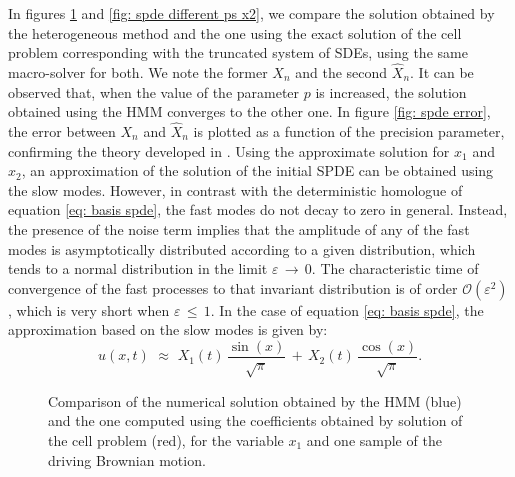 In figures \ref{fig: spde different ps x1} and \ref{fig: spde different ps x2}, we compare the solution obtained by the heterogeneous method and the one using the exact solution of the cell problem corresponding with the truncated system of SDEs, using the same macro-solver for both. We note the former $X_n$ and the second $\hat X_n$. It can be observed that, when the value of the parameter $p$ is increased, the solution obtained using the HMM converges to the other one. In figure \ref{fig: spde error}, the error between $X_n$ and $\hat X_n$ is plotted as a function of the precision parameter, confirming the theory developed in \citep{abdulle2012numerical,weinan2005analysis}. Using the approximate solution for $x_1$ and $x_2$, an approximation of the solution of the initial SPDE can be obtained using the slow modes. However, in contrast with the deterministic homologue of equation \eqref{eq: basis spde}, the fast modes do not  decay to zero in general. Instead, the presence of the noise term implies that the amplitude of any of the fast modes is asymptotically distributed according to a given distribution, which tends to a normal distribution in the limit ${\varepsilon}\,\to\, 0$. The characteristic time of convergence of the fast processes to that invariant distribution is of order $\mathcal O({\varepsilon}^2)$, which is very short when ${\varepsilon}\,\leq\,1$. In the case of equation \eqref{eq: basis spde}, the approximation based on the slow modes is given by:
\begin{equation*}
    u(x,t) \,\,{\approx}\,\, X_1(t) \,\frac{\sin(x)}{\sqrt{\pi}} \,+\, X_2(t) \,\frac{\cos(x)}{\sqrt{\pi}}. 
\end{equation*}
\begin{figure}[h!]
    \caption{Comparison of the numerical solution obtained by the HMM (blue) and the one computed using the coefficients obtained by solution of the cell problem (red), for the variable $x_1$ and one sample of the driving Brownian motion.}
    \label{fig: spde different ps x1}
\end{figure}
%         

